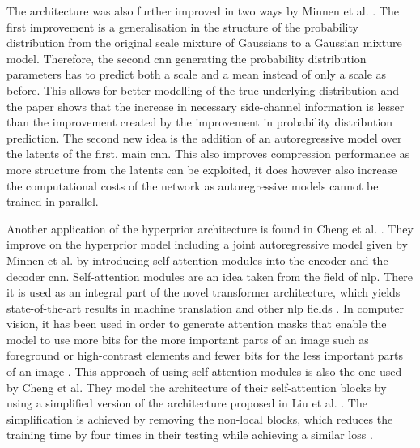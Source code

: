 The architecture was also further improved in two ways by Minnen et al. \citep{minnen_joint_2018}. The first improvement is a generalisation in the structure of the probability distribution from the original scale mixture of Gaussians \citep{wainwright_scale_1999} to a Gaussian mixture model. Therefore, the second \ac{cnn} generating the probability distribution parameters has to predict both a scale and a mean instead of only a scale as before. This allows for better modelling of the true underlying distribution and the paper shows that the increase in necessary side-channel information is lesser than the improvement created by the improvement in probability distribution prediction.
The second new idea is the addition of an autoregressive model over the latents of the first, main \ac{cnn}. This also improves compression performance as more structure from the latents can be exploited, it does however also increase the computational costs of the network as autoregressive models cannot be trained in parallel. 

Another application of the hyperprior architecture is found in Cheng et al. \citep{cheng_learned_2020}. They improve on the hyperprior model including a joint autoregressive model given by Minnen et al. \citep{minnen_joint_2018} by introducing self-attention modules into the encoder and the decoder \ac{cnn}. Self-attention modules are an idea taken from the field of \ac{nlp}. There it is used as an integral part of the novel transformer architecture, which yields state-of-the-art results in machine translation and other \ac{nlp} fields \citep{vaswani_attention_2017}. In computer vision, it has been used in order to generate attention masks that enable the model to use more bits for the more important parts of an image such as foreground or high-contrast elements and fewer bits for the less important parts of an image \citep{liu_non-local_2019,li_learning_2017,mentzer_conditional_2019}. This approach of using self-attention modules is also the one used by Cheng et al. They model the architecture of their self-attention blocks by using a simplified version of the architecture proposed in Liu et al. \citep{liu_non-local_2019}. The simplification is achieved by removing the non-local blocks, which reduces the training time by four times in their testing while achieving a similar loss \citep{cheng_learned_2020}.
